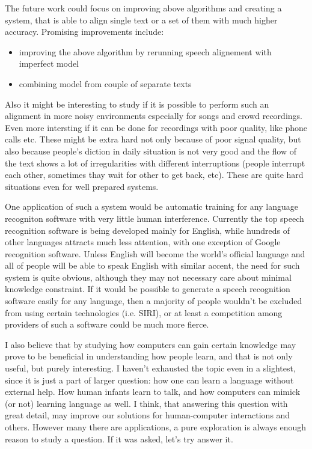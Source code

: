 \documentclass[12pt,a4paper,english]{article}
\begin{document}
The future work could focus on improving above algorithms and creating a system, that is able to align single text or a set of them with much higher accuracy.
Promising improvements include:
\begin{itemize}
    \item improving the above algorithm by rerunning speech alignement with imperfect model
    \item combining model from couple of separate texts
\end{itemize}
Also it might be interesting to study if it is possible to perform such an alignment in more noisy environments especially for songs and crowd recordings. \newline
Even more intersting if it can be done for recordings with poor quality, like phone calls etc. These might be extra hard not only because of poor signal quality, but also because people's diction in daily situation is not very good and the flow of the text shows a lot of irregularities with different interruptions (people interrupt each other, sometimes thay wait for other to get back, etc). \newline
These are quite hard situations even for well prepared systems. \newline

One application of such a system would be automatic training for any language recogniton software with very little human interference. Currently the top speech recognition software is being developed mainly for English, while hundreds of other languages attracts much less attention, with one exception of Google recognition software. Unless English will become the world's official language and all of people will be able to speak English with similar accent, the need for such system is quite obvious, although they may not necessary care about minimal knowledge constraint. \newline
If it would be possible to generate a speech recognition software easily for any language, then a majority of people wouldn't be excluded from using certain technologies (i.e. SIRI), or at least a competition among providers of such a software could be much more fierce. \newline

I also believe that by studying how computers can gain certain knowledge may prove to be beneficial in understanding how people learn, and that is not only useful, but purely interesting. \newline
I haven't exhausted the topic even in a slightest, since it is just a part of larger question: how one can learn a language without external help. How human infants learn to talk, and how computers can mimick (or not) learning language as well. \newline
I think, that answering this question with great detail, may improve our solutions for human-computer interactions and others. \newline
However many there are applications, a pure exploration is always enough reason to study a question. If it was asked, let's try answer it. \newline
\end{document}
